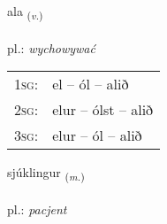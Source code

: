 \documentclass[frontgrid, backgrid]{flacards}\usepackage[]{graphicx}\usepackage[]{xcolor}
\begin{document}
\renewcommand{\flhead}{\vskip5pt \fboxsep=0pt {\small\bfseries\footnotesize Sagnorð | czasownik}}
\renewcommand{\fcfoot}{\vskip5pt \fboxsep=0pt \hspace{2pt}{\small\bfseries\footnotesize 1K}}

\renewcommand{\blhead}{\vskip5pt {\small\bfseries\footnotesize Sagnorð | czasownik }}
\renewcommand{\bcfoot}{\vskip5pt \hspace{2pt}{\small\bfseries\footnotesize 1K}}


{ala \small{\textsubscript{(\textit{v.})}} \\[1ex] %
\textphonetic{[aːla]} \\
pl.: \emph{wychowywać} \\  [2ex]
\renewcommand*{\arraystretch}{0.8}
\begin{tabular}{p{1cm}l}
\textsc{1sg}: & el -- ól -- alið \\ 
\textsc{2sg}: & elur -- ólst -- alið \\ 
\textsc{3sg}: & elur -- ól -- alið \\ 
\end{tabular}
}

\renewcommand{\flhead}{\vskip5pt \fboxsep=0pt {\small\bfseries\footnotesize Nafnorð | rzeczownik}}
\renewcommand{\fcfoot}{\vskip5pt \fboxsep=0pt \hspace{2pt}{\small\bfseries\footnotesize 1K}}

\renewcommand{\blhead}{\vskip5pt {\small\bfseries\footnotesize Nafnorð | rzeczownik }}
\renewcommand{\bcfoot}{\vskip5pt \hspace{2pt}{\small\bfseries\footnotesize 1K}}


{sjúklingur \small{\textsubscript{(\textit{m.})}} \\[1ex] %
\textphonetic{[sjuhkliŋkʏr]} \\
pl.: \emph{pacjent} \\  [2ex]
\renewcommand*{\arraystretch}{0.8}
}
\end{document}

